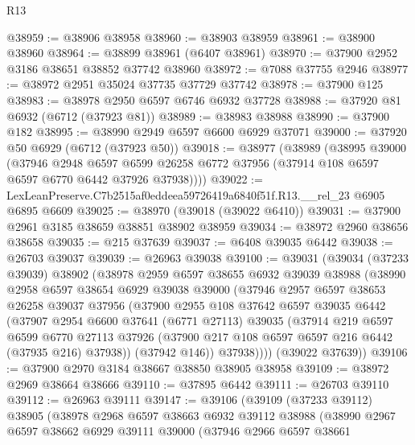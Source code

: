 \begin{lexlean}{R13}
\begin{coremodule}
@38959 := @38906 @38958
@38960 := @38903 @38959
@38961 := @38900 @38960
@38964 := @38899 @38961 (@6407 @38961)
@38970 := @37900 @2952 @3186 @38651 @38852 @37742 @38960
@38972 := @7088 @37755 @2946
@38977 := @38972 @2951 @35024 @37735 @37729 @37742
@38978 := @37900 @125
@38983 := @38978 @2950 @6597 @6746 @6932 @37728
@38988 := @37920 @81 @6932 (@6712 (@37923 @81))
@38989 := @38983 @38988
@38990 := @37900 @182
@38995 := @38990 @2949 @6597 @6600 @6929 @37071
@39000 := @37920 @50 @6929 (@6712 (@37923 @50))
@39018 := @38977
    (@38989
      (@38995
        @39000
        (@37946
          @2948
          @6597
          @6599
          @26258
          @6772
          @37956
          (@37914 @108 @6597 @6597 @6770 @6442 @37926 @37938))))
@39022 := LexLeanPreserve.C7b2515af0eddeea59726419a6840f51f.R13.__rel_23 @6905 @6895 @6609
@39025 := @38970 (@39018 (@39022 @6410))
@39031 := @37900 @2961 @3185 @38659 @38851 @38902 @38959
@39034 := @38972 @2960 @38656 @38658
@39035 := @215 @37639
@39037 := @6408 @39035 @6442
@39038 := @26703 @39037
@39039 := @26963 @39038
@39100 := @39031
    (@39034
      (@37233 @39039)
      @38902
      (@38978
        @2959
        @6597
        @38655
        @6932
        @39039
        @38988
        (@38990
          @2958
          @6597
          @38654
          @6929
          @39038
          @39000
          (@37946
            @2957
            @6597
            @38653
            @26258
            @39037
            @37956
            (@37900
              @2955
              @108
              @37642
              @6597
              @39035
              @6442
              (@37907
                @2954
                @6600
                @37641
                (@6771 @27113)
                @39035
                (@37914
                  @219
                  @6597
                  @6599
                  @6770
                  @27113
                  @37926
                  (@37900 @217 @108 @6597 @6597 @216 @6442 (@37935 @216) @37938))
                (@37942 @146))
              @37938))))
      (@39022 @37639))
@39106 := @37900 @2970 @3184 @38667 @38850 @38905 @38958
@39109 := @38972 @2969 @38664 @38666
@39110 := @37895 @6442
@39111 := @26703 @39110
@39112 := @26963 @39111
@39147 := @39106
    (@39109
      (@37233 @39112)
      @38905
      (@38978
        @2968
        @6597
        @38663
        @6932
        @39112
        @38988
        (@38990
          @2967
          @6597
          @38662
          @6929
          @39111
          @39000
          (@37946
            @2966
            @6597
            @38661

\end{coremodule}
\end{lexlean}
